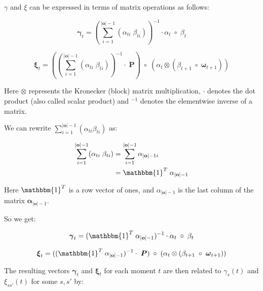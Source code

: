 $\gamma$ and $\xi$ can be expressed in terms of matrix operations as follows:

\begin{equation}
    \boldsymbol{\gamma}_t = (\sum_{i=1}^{|\mathbf{o}|-1} (\alpha_{t i} \;\beta_{t i}))^{-1} \cdot \alpha_t \; \circ \; \beta_t
    \label{eq:gamma-matrix}
\end{equation}

\begin{equation}
    \boldsymbol{\xi}_t = ((\sum_{i=1}^{|\mathbf{o}|-1} (\alpha_{t i} \; \beta_{t i}))^{-1} \cdot \; \boldsymbol{P}) \; \circ \;(\alpha_t \otimes (\beta_{t+1} \; \circ \; \boldsymbol{\omega}_{t+1}))
    \label{eq:xi-matrix}
\end{equation}

Here $\otimes$ represents the Kronecker (block) matrix multiplication, $\cdot$ denotes the dot product (also called scalar product) and $^{-1}$ denotes the elementwise inverse of a matrix.

We can rewrite $\sum_{i=1}^{|\mathbf{o}|-1} (\alpha_{t i} \beta_{t i})$ as:

\begin{align}
    \sum_{i=1}^{|\mathbf{o}|-1} (\alpha_{t i} \; \beta_{t i}) &= \sum_{i=1}^{|\mathbf{o}|-1} \alpha_{|\mathbf{o}|-1 i} \\
    &= \mathbbm{1}^T \; \alpha_{|\mathbf{o}|-1}
\end{align}

Here $\mathbbm{1}^T$ is a row vector of ones, and $\alpha_{|\mathbf{o}|-1}$ is the last column of the matrix $\boldsymbol{\alpha}_{|\mathbf{o}|-1}$.

So we get:

\begin{equation}
    \boldsymbol{\gamma}_t = (\mathbbm{1}^T \; \alpha_{|\mathbf{o}|-1})^{-1} \cdot \alpha_t \; \circ \; \beta_t
    \label{eq:gamma-matrix-ones}
\end{equation}

\begin{equation}
    \boldsymbol{\xi}_t = ((\mathbbm{1}^T \; \alpha_{|\mathbf{o}|-1})^{-1} \cdot \; \boldsymbol{P}) \; \circ \;(\alpha_t \otimes (\beta_{t+1} \; \circ \; \boldsymbol{\omega}_{t+1}))
    \label{eq:xi-matrix-ones}
\end{equation}

The resulting vectors $\boldsymbol{\gamma}_t$ and $\boldsymbol{\xi}_t$ for each moment $t$ are then related to $\gamma_s(t)$ and $\xi_{ss'}(t)$ for some $s, s'$ by:

